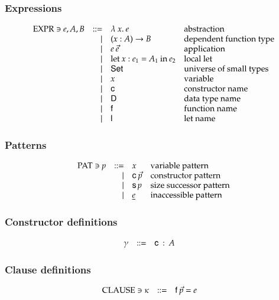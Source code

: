 \subsubsection{Expressions}
\[
\begin{array}{lrll}
\operatorname{EXPR} \ni e,A,B & ::= & \lambda\: x .\:{e} & \mbox{abstraction}\\
& \mid & ( x : A ) \rightarrow{B} & \mbox{dependent function type}\\
& \mid & e \: \vec{e} & \mbox{application}\\
& \mid & \mathrm{let}\: x : e_1 = A_1 \: \mathrm{in}\:{e_2} & \mbox{local let}\\ 
& \mid & \mathsf{Set} & \mbox{universe of small types}\\
& \mid & x & \mbox{variable}\\
& \mid & \mathsf{c} & \mbox{constructor name}\\
& \mid & \mathsf{D} & \mbox{data type name}\\
& \mid & \mathsf{f} & \mbox{function name}\\
& \mid & \mathsf{l} & \mbox{let name}
\end{array}
\]

\subsubsection{Patterns}
\[
\begin{array}{lrll}
\operatorname{PAT} \ni p & ::= & x & \mbox{variable pattern}\\
& \mid & \mathsf{c} \: \vec{p} & \mbox{constructor pattern}\\
& \mid & \mathsf{s}\, p & \mbox{size successor pattern}\\
& \mid & \underline{e} & \mbox{inaccessible pattern}\\
\end{array}
\]

\subsubsection{Constructor definitions}
\[
\begin{array}{lrll}
\gamma &  ::= & \mathsf{c} \: : \: A & 
\end{array}
\]

\subsubsection{Clause definitions}
\[
\begin{array}{lrll}
\operatorname{CLAUSE} \ni \kappa & ::= & \mathsf{f} \: \vec{p} = e & 
\end{array}
\]

